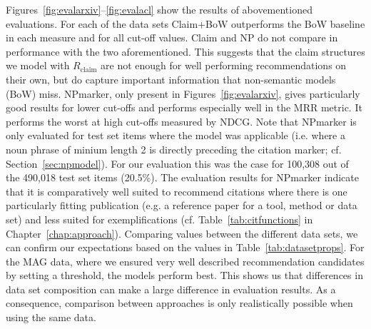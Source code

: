 Figures~\ref{fig:evalarxiv}--\ref{fig:evalacl} show the results of abovementioned evaluations. For each of the data sets Claim+BoW outperforms the BoW baseline in each measure and for all cut-off values. Claim and NP do not compare in performance with the two aforementioned. This suggests that the claim structures we model with $R_{\text{claim}}$ are not enough for well performing recommendations on their own, but do capture important information that non-semantic models (BoW) miss. NPmarker, only present in Figures~\ref{fig:evalarxiv}, gives particularly good results for lower cut-offs and performs especially well in the MRR metric. It performs the worst at high cut-offs measured by NDCG. Note that NPmarker is only evaluated for test set items where the model was applicable (i.e. where a noun phrase of minium length 2 is directly preceding the citation marker; cf. Section~\ref{sec:npmodel}). For our evaluation this was the case for 100,308 out of the 490,018 test set items (20.5\%). The evaluation results for NPmarker indicate that it is comparatively well suited to recommend citations where there is one particularly fitting publication (e.g. a reference paper for a tool, method or data set) and less suited for exemplifications (cf. Table~\ref{tab:citfunctions} in Chapter~\ref{chap:approach}). Comparing values between the different data sets, we can confirm our expectations based on the values in Table~\ref{tab:datasetprops}. For the MAG data, where we ensured very well described recommendation candidates by setting a threshold, the models perform best.
This shows us that differences in data set composition can make a large difference in evaluation results. As a consequence, comparison between approaches is only realistically possible when using the same data.



